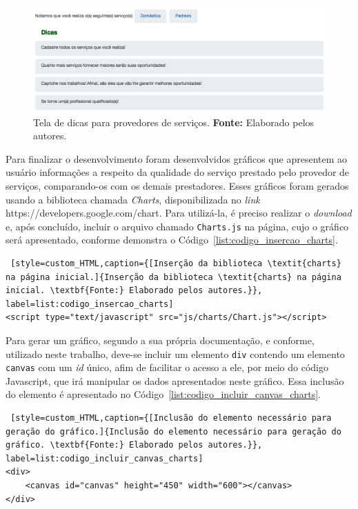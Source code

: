 \begin{figure}[h!]
	\centerline{\includegraphics[scale=0.4]{./imagens/dicas-randomicas.png}}
	\caption[Tela de dicas para provedores de serviços.]
	{Tela de dicas para provedores de serviços. \textbf{Fonte:} Elaborado pelos autores.}
	\label{fig:dicas_randomicas}
\end{figure}

\par Para finalizar o desenvolvimento foram desenvolvidos gráficos que apresentem ao usuário informações a respeito da qualidade do serviço prestado pelo provedor de serviços, comparando-os com os demais prestadores. Esses gráficos foram gerados usando a biblioteca chamada \textit{Charts}, disponibilizada no \textit{link} https://developers.google.com/chart. Para utilizá-la, é preciso realizar o \textit{download} e, após concluído, incluir o arquivo chamado \texttt{Charts.js} na página, cujo o gráfico será apresentado, conforme demonstra o Código~\ref{list:codigo_insercao_charts}.

\begin{lstlisting} [style=custom_HTML,caption={[Inserção da biblioteca \textit{charts} na página inicial.]{Inserção da biblioteca \textit{charts} na página inicial. \textbf{Fonte:} Elaborado pelos autores.}}, label=list:codigo_insercao_charts] 	
<script type="text/javascript" src="js/charts/Chart.js"></script>
\end{lstlisting}

\par Para gerar um gráfico, segundo a sua própria documentação, e conforme, utilizado neste trabalho, deve-se incluir um elemento \texttt{div} contendo um elemento \texttt{canvas} com um \textit{id} único, afim de facilitar o acesso a ele, por meio do código Javascript, que irá manipular os dados apresentados neste gráfico. Essa inclusão do elemento é apresentado no Código~\ref{list:codigo_incluir_canvas_charts}.

\begin{lstlisting} [style=custom_HTML,caption={[Inclusão do elemento necessário para geração do gráfico.]{Inclusão do elemento necessário para geração do gráfico. \textbf{Fonte:} Elaborado pelos autores.}}, label=list:codigo_incluir_canvas_charts] 	
<div>
	<canvas id="canvas" height="450" width="600"></canvas>
</div>
\end{lstlisting}

